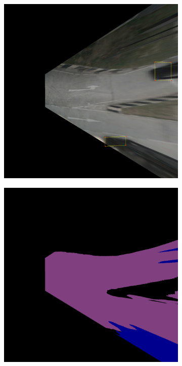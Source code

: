 \begin{figure}[h!]
    \centering
    \begin{subfigure}[b]{0.22\textwidth}
        \includegraphics[width=\textwidth]{images/methodology/bev_occupancy_oclusion/bev_cuboid_9.png}
        \caption{}
        \label{fig:bev_occupancy_occlusion_a}
    \end{subfigure}
    \hfill
    \begin{subfigure}[b]{0.22\textwidth}
        \includegraphics[width=\textwidth]{images/methodology/bev_occupancy_oclusion/bev_semantic_color_9.png}

\end{subfigure}
\end{figure}
